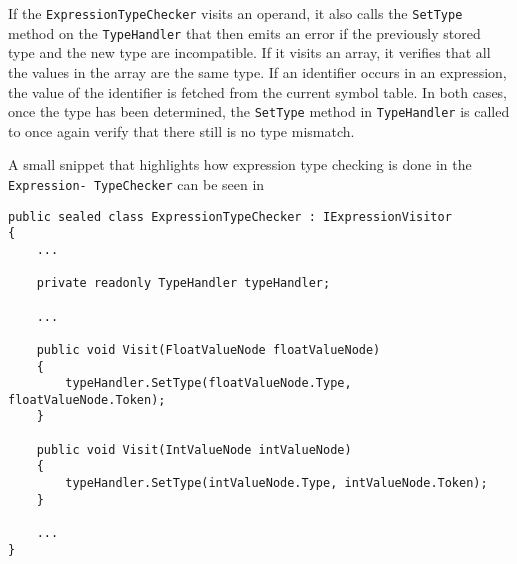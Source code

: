 If the \texttt{ExpressionTypeChecker} visits an operand, it also calls the \texttt{SetType} method on the \texttt{TypeHandler} that then emits an error if the previously stored type and the new type are incompatible. 
If it visits an array, it verifies that all the values in the array are the same type. 
If an identifier occurs in an expression, the value of the identifier is fetched from the current symbol table.
In both cases, once the type has been determined, the \texttt{SetType} method in \texttt{TypeHandler} is called to once again verify that there still is no type mismatch.


A small snippet that highlights how expression type checking is done in the \texttt{Expression-
TypeChecker} can be seen in 

\begin{lstlisting}[language=CSharp, caption={Two simple visit methods for integers and floats in the \texttt{ExpressionTypeChecker} class.}, label={lst:ExpressionTypeChecker},escapechar=|]
public sealed class ExpressionTypeChecker : IExpressionVisitor
{
    ...
    
    private readonly TypeHandler typeHandler;
    
    ...

    public void Visit(FloatValueNode floatValueNode)
    {
        typeHandler.SetType(floatValueNode.Type, floatValueNode.Token);
    }

    public void Visit(IntValueNode intValueNode)
    {
        typeHandler.SetType(intValueNode.Type, intValueNode.Token);
    }

    ...
}
\end{lstlisting}
